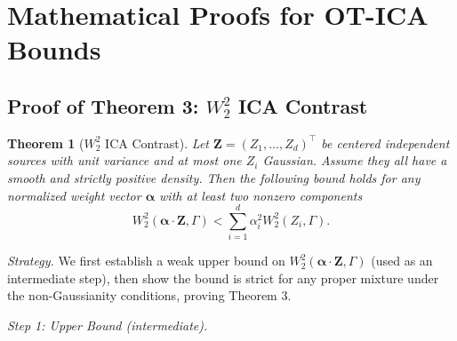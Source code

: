 \documentclass[accepted]{tpm2026} %
\newtheorem{theorem}{Theorem}
\begin{document}
\section{Mathematical Proofs for OT-ICA Bounds}
\label{app:proofs}

\subsection{Proof of Theorem 3: $W_2^2$ ICA Contrast}

\setcounter{theorem}{2}
\begin{theorem}[$W_2^2$ ICA Contrast]
Let $\mathbf{Z} = (Z_1, \dots, Z_d)^\top$ be  centered independent sources with unit variance and at most one $Z_i$ Gaussian. Assume they all have a smooth and strictly positive density. Then the following bound holds for  any normalized weight vector $\mathbf{\alpha}$ with at least two nonzero components
\begin{equation}
    W_2^2(\mathbf{\alpha} \cdot \mathbf{Z}, \Gamma) < \sum_{i=1}^d \alpha_i^2 W_2^2(Z_i, \Gamma).
\end{equation}
\end{theorem}

\textit{Strategy.} We first establish a weak upper bound on $W_2^2(\mathbf{\alpha}\cdot\mathbf{Z},\Gamma)$ (used as an intermediate step), then show the bound is strict for any proper mixture under the non-Gaussianity conditions, proving Theorem 3.

\medskip\noindent\textit{Step 1: Upper Bound (intermediate).}
\end{document}
